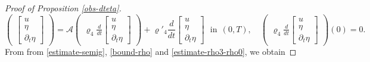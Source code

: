 \documentclass[a4paper, 12pt]{article}
\theoremstyle{plain}
\theoremstyle{definition}
\numberwithin{theorem}{section}
\numberwithin{equation}{section}
\begin{document}
{\begin{proof}[Proof of Proposition \ref{obs-dteta}]
\begin{equation}
\begin{pmatrix}
\begin{bmatrix}
    u\\
    \eta\\
    \partial_t\eta
\end{bmatrix}\end{pmatrix}=\mathcal{A}\begin{pmatrix}\varrho_4\frac{d}{dt}\begin{bmatrix}
    u\\
    \eta\\
    \partial_t\eta
\end{bmatrix}\end{pmatrix}+\varrho'_4\frac{d}{dt}\begin{bmatrix}
  u\\
  \eta\\
  \partial_t\eta
\end{bmatrix}~~~\text{in}~~(0,T),\quad \begin{pmatrix}\varrho_4\frac{d}{dt}\begin{bmatrix}
  u\\
  \eta\\
  \partial_t\eta
\end{bmatrix}\end{pmatrix}(0)=0.
\end{equation}
From from \eqref{estimate-semig}, \eqref{bound-rho} and \eqref{estimate-rho3-rho0}, we obtain 


\end{proof}}
\end{document}
